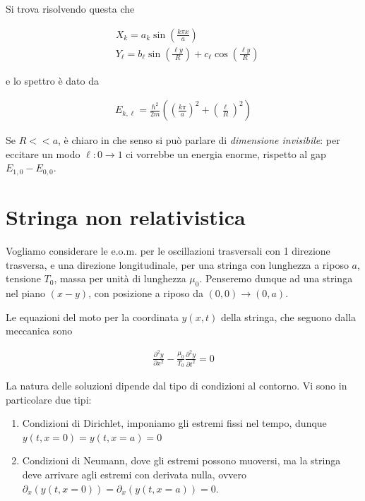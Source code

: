 \documentclass{report}
\begin{document}
Si trova risolvendo questa che 

\begin{align}
    &X_k = a_k\sin\left(\frac{k\pi x}{a} \right) \\
    &Y_\ell = b_\ell\sin\left(\frac{\ell y}{R} \right) + c_\ell\cos\left(\frac{\ell y}{R} \right) 
\end{align}


e lo spettro è dato da 

\begin{align}
    E_{k, \ell} = \frac{\hbar^2}{2m}\left(\left(\frac{k\pi}{a} \right)^2  + \left(\frac{\ell}{R} \right)^2\right)
\end{align}

Se \(R << a\), è chiaro in che senso si può parlare di \emph{dimensione invisibile}: per eccitare un modo \(\ell : 0 \rightarrow 1\) ci vorrebbe un energia enorme, rispetto al gap \(E_{1,0}-E_{0,0}\). 

\section{Stringa non relativistica}

Vogliamo considerare le e.o.m. per le oscillazioni trasversali con 1 direzione trasversa, e una direzione longitudinale, per una stringa con lunghezza a riposo \(a\), tensione \(T_0\), massa per unità di lunghezza \(\mu_0\). Penseremo dunque ad una stringa nel piano \((x-y)\), con posizione a riposo da \((0,0) \rightarrow (0, a)\). 

Le equazioni del moto per la coordinata \(y(x,t)\) della stringa, che seguono dalla meccanica sono 

\begin{align}
    \frac{\partial^2y}{\partial x^2} - \frac{\mu_0}{T_0}\frac{\partial^2 y}{\partial t^2} = 0 
\end{align}

La natura delle soluzioni dipende dal tipo di condizioni al contorno. Vi sono in particolare due tipi: 

\begin{enumerate}
    \item Condizioni di Dirichlet, imponiamo gli estremi fissi nel tempo, dunque \(y(t, x=0) = y(t, x=a) = 0\)
    \item Condizioni di Neumann, dove gli estremi possono muoversi, ma la stringa deve arrivare agli estremi con derivata nulla, ovvero \(\partial_x(y(t, x=0)) = \partial_x(y(t, x=a)) = 0\). 
\end{enumerate}
\end{document}
